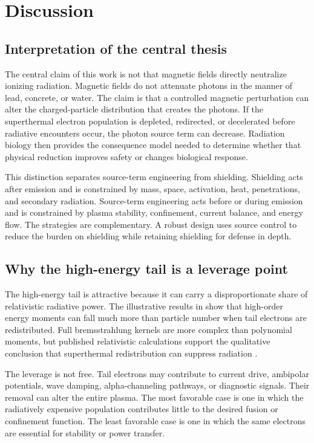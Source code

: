 \chapter{Discussion}
\label{ch:discussion}

\section{Interpretation of the central thesis}

The central claim of this work is not that magnetic fields directly neutralize ionizing radiation. Magnetic fields do not attenuate photons in the manner of lead, concrete, or water. The claim is that a controlled magnetic perturbation can alter the charged-particle distribution that creates the photons. If the superthermal electron population is depleted, redirected, or decelerated before radiative encounters occur, the photon source term can decrease. Radiation biology then provides the consequence model needed to determine whether that physical reduction improves safety or changes biological response.

This distinction separates source-term engineering from shielding. Shielding acts after emission and is constrained by mass, space, activation, heat, penetrations, and secondary radiation. Source-term engineering acts before or during emission and is constrained by plasma stability, confinement, current balance, and energy flow. The strategies are complementary. A robust design uses source control to reduce the burden on shielding while retaining shielding for defense in depth.

\section{Why the high-energy tail is a leverage point}

The high-energy tail is attractive because it can carry a disproportionate share of relativistic radiative power. The illustrative results in  show that high-order energy moments can fall much more than particle number when tail electrons are redistributed. Full bremsstrahlung kernels are more complex than polynomial moments, but published relativistic calculations support the qualitative conclusion that superthermal redistribution can suppress radiation \cite{munirov2023}.

The leverage is not free. Tail electrons may contribute to current drive, ambipolar potentials, wave damping, alpha-channeling pathways, or diagnostic signals. Their removal can alter the entire plasma. The most favorable case is one in which the radiatively expensive population contributes little to the desired fusion or confinement function. The least favorable case is one in which the same electrons are essential for stability or power transfer.

